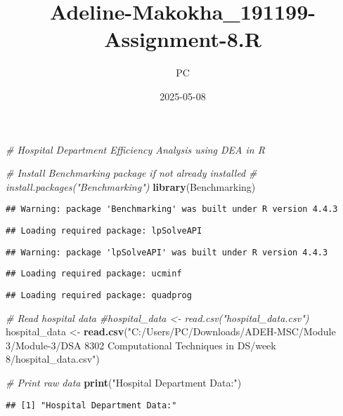 \documentclass[
]{article}
\title{Adeline-Makokha\_191199-Assignment-8.R}
\author{PC}
\date{2025-05-08}
\newenvironment{Shaded}{\begin{snugshade}}{\end{snugshade}}
\newcommand{\CommentTok}[1]{\textcolor[rgb]{0.56,0.35,0.01}{\textit{#1}}}
\newcommand{\FunctionTok}[1]{\textcolor[rgb]{0.13,0.29,0.53}{\textbf{#1}}}
\newcommand{\NormalTok}[1]{#1}
\newcommand{\OtherTok}[1]{\textcolor[rgb]{0.56,0.35,0.01}{#1}}
\newcommand{\StringTok}[1]{\textcolor[rgb]{0.31,0.60,0.02}{#1}}
\begin{document}
\maketitle

\begin{Shaded}
\begin{Highlighting}[]
\CommentTok{\# Hospital Department Efficiency Analysis using DEA in R}

\CommentTok{\# Install Benchmarking package if not already installed}
\CommentTok{\# install.packages("Benchmarking")}
\FunctionTok{library}\NormalTok{(Benchmarking)}
\end{Highlighting}
\end{Shaded}

\begin{verbatim}
## Warning: package 'Benchmarking' was built under R version 4.4.3
\end{verbatim}

\begin{verbatim}
## Loading required package: lpSolveAPI
\end{verbatim}

\begin{verbatim}
## Warning: package 'lpSolveAPI' was built under R version 4.4.3
\end{verbatim}

\begin{verbatim}
## Loading required package: ucminf
\end{verbatim}

\begin{verbatim}
## Loading required package: quadprog
\end{verbatim}

\begin{Shaded}
\begin{Highlighting}[]
\CommentTok{\# Read hospital data}
\CommentTok{\#hospital\_data \textless{}{-} read.csv("hospital\_data.csv")}
\NormalTok{hospital\_data }\OtherTok{\textless{}{-}} \FunctionTok{read.csv}\NormalTok{(}\StringTok{"C:/Users/PC/Downloads/ADEH{-}MSC/Module 3/Module{-}3/DSA 8302 Computational Techniques in DS/week 8/hospital\_data.csv"}\NormalTok{)}


\CommentTok{\# Print raw data}
\FunctionTok{print}\NormalTok{(}\StringTok{"Hospital Department Data:"}\NormalTok{)}
\end{Highlighting}
\end{Shaded}

\begin{verbatim}
## [1] "Hospital Department Data:"
\end{verbatim}
\end{document}
